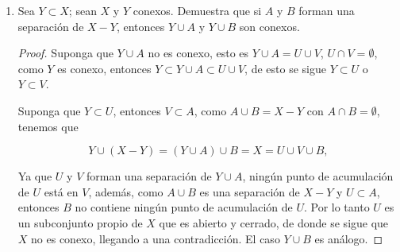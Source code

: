 \documentclass[11pt]{article}
\begin{document}
\begin{enumerate}
\begin{proof}
  lo que contradice el hecho de que $Y$ es conexo. 
    \end{proof}

    \item Sea $Y \subset X$; sean $X$  y $Y$ conexos. Demuestra que si $A$ y $B$ forman una separación de $X - Y$, entonces $Y \cup A$ y $Y \cup B$ son conexos.

    \begin{proof}
        Suponga que $Y\cup A$ no es conexo, esto es $Y\cup A=U\cup V$, $U\cap V=\emptyset$, como $Y$ es conexo, entonces $Y\subset Y\cup A\subset U\cup V $, de esto se sigue $Y\subset U$ o $Y\subset V$.

        Suponga que $Y\subset U$, entonces $V\subset A$, como $A\cup B=X-Y$ con $A\cap B=\emptyset$, tenemos que 

        $$Y\cup (X-Y)=(Y\cup A)\cup B=X=U\cup V\cup B,$$

        Ya que $U$ y $V$ forman una separación de $Y \cup A$, ningún punto de acumulación de $U$ está en $V$, además, como $A \cup B$ es una separación de $X-Y$ y $U \subset A$, entonces $B$ no contiene ningún punto de acumulación de $U$. Por lo tanto $U$ es un subconjunto propio de $X$ que es abierto y cerrado, de donde se sigue que $X$ no es conexo, llegando a una contradicción. El caso $Y \cup B$ es análogo.  
    \end{proof}

\end{enumerate}
\end{document}
